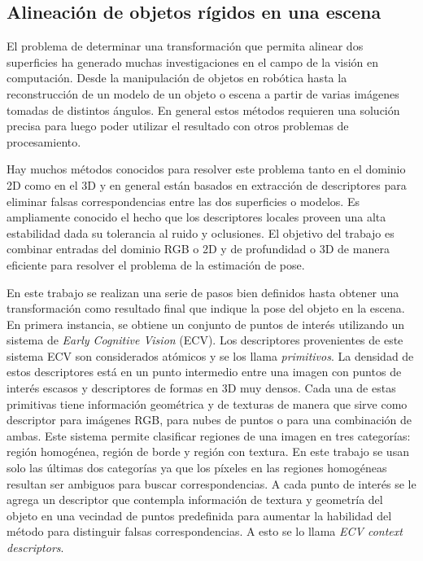 \subsection{Alineación de objetos rígidos en una escena}\label{alignment_prerejective}
El problema de determinar una transformación que permita alinear dos superficies ha generado muchas investigaciones en el campo de la visión en computación. Desde la manipulación de objetos en robótica hasta la reconstrucción de un modelo de un objeto o escena a partir de varias imágenes tomadas de distintos ángulos. En general estos métodos requieren una solución precisa para luego poder utilizar el resultado con otros problemas de procesamiento.

Hay muchos métodos conocidos para resolver este problema tanto en el dominio 2D como en el 3D y en general están basados en extracción de descriptores para eliminar falsas correspondencias entre las dos superficies o modelos. Es ampliamente conocido el hecho que los descriptores locales proveen una alta estabilidad dada su tolerancia al ruido y oclusiones. El objetivo del trabajo \cite{6630856} es combinar entradas del dominio RGB o 2D y de profundidad o 3D de manera eficiente para resolver el problema de la estimación de pose.

En este trabajo se realizan una serie de pasos bien definidos hasta obtener una transformación como resultado final que indique la pose del objeto en la escena. En primera instancia, se obtiene un conjunto de puntos de interés utilizando un sistema de \textit{Early Cognitive Vision} (ECV). Los descriptores provenientes de este sistema ECV son considerados atómicos y se los llama \textit{primitivos}. La densidad de estos descriptores está en un punto intermedio entre una imagen con puntos de interés escasos y descriptores de formas en 3D muy densos. Cada una de estas primitivas tiene información geométrica y de texturas de manera que sirve como descriptor para imágenes RGB, para nubes de puntos o para una combinación de ambas. Este sistema permite clasificar regiones de una imagen en tres categorías: región homogénea, región de borde y región con textura. En este trabajo se usan solo las últimas dos categorías ya que los píxeles en las regiones homogéneas resultan ser ambiguos para buscar correspondencias.
A cada punto de interés se le agrega un descriptor que contempla información de textura y geometría del objeto en una vecindad de puntos predefinida para aumentar la habilidad del método para distinguir falsas correspondencias. A esto se lo llama \textit{ECV context descriptors}.

